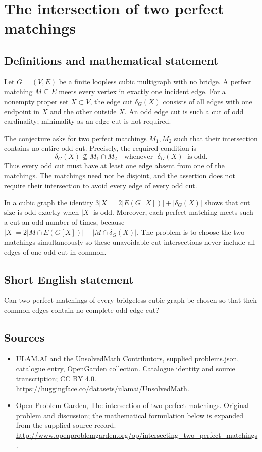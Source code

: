 \documentclass[11pt,a4paper]{article}
\begin{document}
\section*{The intersection of two perfect matchings}\label{statement}

\subsection{Definitions and mathematical statement}
Let $G=(V,E)$ be a finite loopless cubic multigraph with
no bridge. A perfect matching $M\subseteq E$ meets every
vertex in exactly one incident edge. For a nonempty proper
set $X\subset V$, the edge cut $\delta_G(X)$ consists of
all edges with one endpoint in $X$ and the other outside
$X$. An odd edge cut is such a cut of odd cardinality;
minimality as an edge cut is not required.

The conjecture asks for two perfect matchings $M_1,M_2$
such that their intersection contains no entire odd cut.
Precisely, the required condition is
\[
 \delta_G(X)\not\subseteq M_1\cap M_2
 \quad\text{whenever }|\delta_G(X)|\text{ is odd}.
\]
Thus every odd cut must have at least one edge absent
from one of the matchings. The matchings need not be
disjoint, and the assertion does not require their
intersection to avoid every edge of every odd cut.

In a cubic graph the identity
$3|X|=2|E(G[X])|+|\delta_G(X)|$ shows that cut size is
odd exactly when $|X|$ is odd. Moreover, each perfect
matching meets such a cut an odd number of times, because
$|X|=2|M\cap E(G[X])|+|M\cap\delta_G(X)|$.
The problem is to choose the two matchings simultaneously
so these unavoidable cut intersections never include
all edges of one odd cut in common.
\subsection{Short English statement}
Can two perfect matchings of every bridgeless cubic graph be chosen so that their common edges contain no complete odd edge cut?
\subsection{Sources}
\begin{itemize}
\item[S1] ULAM.AI and the UnsolvedMath Contributors, supplied problems.json, catalogue entry, OpenGarden collection. Catalogue identity and source transcription; CC BY 4.0.
\url{https://huggingface.co/datasets/ulamai/UnsolvedMath}.
\item[S2] Open Problem Garden, The intersection of two perfect matchings. Original problem and discussion; the mathematical formulation below is expanded from the supplied source record.
\url{http://www.openproblemgarden.org/op/intersecting_two_perfect_matchings}.
\end{itemize}
\end{document}
